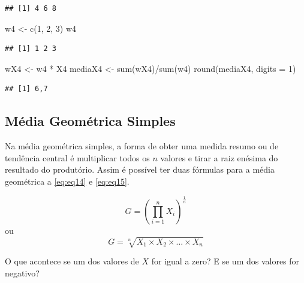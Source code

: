 \documentclass[
]{book}
\newenvironment{Shaded}{\begin{snugshade}}{\end{snugshade}}
\newcommand{\AttributeTok}[1]{\textcolor[rgb]{0.77,0.63,0.00}{#1}}
\newcommand{\DecValTok}[1]{\textcolor[rgb]{0.00,0.00,0.81}{#1}}
\newcommand{\FunctionTok}[1]{\textcolor[rgb]{0.00,0.00,0.00}{#1}}
\newcommand{\NormalTok}[1]{#1}
\newcommand{\OtherTok}[1]{\textcolor[rgb]{0.56,0.35,0.01}{#1}}
\newcommand{\SpecialCharTok}[1]{\textcolor[rgb]{0.00,0.00,0.00}{#1}}
\begin{document}
\begin{verbatim}
## [1] 4 6 8
\end{verbatim}

\begin{Shaded}
\begin{Highlighting}[]
\NormalTok{w4 }\OtherTok{\textless{}{-}} \FunctionTok{c}\NormalTok{(}\DecValTok{1}\NormalTok{, }\DecValTok{2}\NormalTok{, }\DecValTok{3}\NormalTok{)}
\NormalTok{w4}
\end{Highlighting}
\end{Shaded}

\begin{verbatim}
## [1] 1 2 3
\end{verbatim}

\begin{Shaded}
\begin{Highlighting}[]
\NormalTok{wX4 }\OtherTok{\textless{}{-}}\NormalTok{ w4 }\SpecialCharTok{*}\NormalTok{ X4}
\NormalTok{mediaX4 }\OtherTok{\textless{}{-}} \FunctionTok{sum}\NormalTok{(wX4)}\SpecialCharTok{/}\FunctionTok{sum}\NormalTok{(w4)}
\FunctionTok{round}\NormalTok{(mediaX4, }\AttributeTok{digits =} \DecValTok{1}\NormalTok{)}
\end{Highlighting}
\end{Shaded}

\begin{verbatim}
## [1] 6,7
\end{verbatim}

\hypertarget{muxe9dia-geomuxe9trica-simples}{%
\subsection{Média Geométrica Simples}\label{muxe9dia-geomuxe9trica-simples}}

Na média geométrica simples, a forma de obter uma medida resumo ou de tendência central é multiplicar todos os \(n\) valores e tirar a raiz enésima do resultado do produtório. Assim é possível ter duas fórmulas para a média geométrica a \eqref{eq:eq14} e \eqref{eq:eq15}.

\begin{equation}
    G = \left(\prod_{i=1}^{n} X_i \right)^{\frac{1}{n}}
    \label{eq:eq14}
\end{equation}
ou
\begin{equation}
    G = \sqrt[n]{X_1 \times X_2 \times \ldots \times X_n}
    \label{eq:eq15}
\end{equation}

O que acontece se um dos valores de \(X\) for igual a zero? E se um dos valores for negativo?
\end{document}

